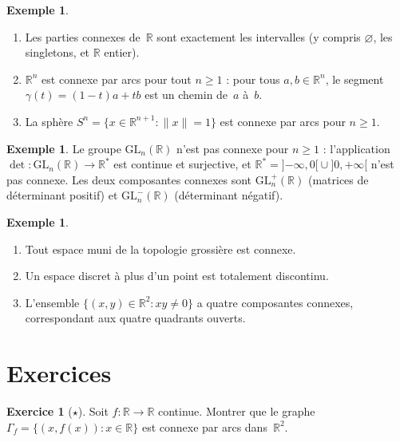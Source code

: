 \documentclass[12pt,a4paper,openany]{book}
\theoremstyle{definition}
\theoremstyle{cours}
\theoremstyle{coursnormal}
\newtheorem{exemple}[theoreme]{Exemple}
\newtheorem{exercice}{Exercice}[chapter]
\begin{document}
\begin{exemple}
\label{ex:connexes-R}
\begin{enumerate}[label=(\alph*)]
  \item Les parties connexes de~$\mathbb{R}$ sont exactement les intervalles
        (y compris $\varnothing$, les singletons, et $\mathbb{R}$ entier).
  \item $\mathbb{R}^n$ est connexe par arcs pour tout $n \geqslant 1$ : pour tous
        $a, b \in \mathbb{R}^n$, le segment $\gamma(t) = (1-t)a + tb$ est un chemin
        de~$a$ à~$b$.
  \item La sphère $S^n = \{x \in \mathbb{R}^{n+1} : \|x\| = 1\}$ est connexe
        par arcs pour $n \geqslant 1$.
\end{enumerate}
\end{exemple}

\begin{exemple}
\label{ex:GL-connexe}
Le groupe $\mathrm{GL}_n(\mathbb{R})$ n'est pas connexe pour $n \geqslant 1$ :
l'application $\det \colon \mathrm{GL}_n(\mathbb{R}) \to \mathbb{R}^*$ est continue
et surjective, et $\mathbb{R}^* = {]{-\infty},0[} \cup {]0,{+\infty}[}$ n'est pas
connexe. Les deux composantes connexes sont $\mathrm{GL}_n^+(\mathbb{R})$
(matrices de déterminant positif) et $\mathrm{GL}_n^-(\mathbb{R})$ (déterminant négatif).
\end{exemple}

\begin{exemple}
\label{ex:connexes-divers}
\begin{enumerate}[label=(\alph*)]
  \item Tout espace muni de la topologie grossière est connexe.
  \item Un espace discret à plus d'un point est totalement discontinu.
  \item L'ensemble $\{(x,y) \in \mathbb{R}^2 : xy \neq 0\}$ a quatre composantes
        connexes, correspondant aux quatre quadrants ouverts.
\end{enumerate}
\end{exemple}

\section{Exercices}
\label{sec:exo-connexite}

\begin{exercice}[$\star$]
\label{exo:connexe-image}
Soit $f \colon \mathbb{R} \to \mathbb{R}$ continue. Montrer que le graphe
$\Gamma_f = \{(x, f(x)) : x \in \mathbb{R}\}$ est connexe par arcs dans~$\mathbb{R}^2$.
\end{exercice}
\end{document}
